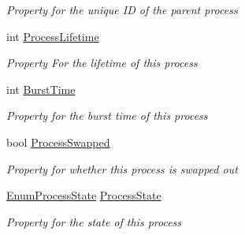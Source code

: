 \begin{DoxyCompactItemize}
\begin{DoxyCompactList}\small\item\em Property for the unique I\+D of the parent process \end{DoxyCompactList}\item 
int \hyperlink{class_c_p_u___o_s___simulator_1_1_operating___system_1_1_simulator_process_afa82367303a9ea2effba290493847605}{Process\+Lifetime}
\begin{DoxyCompactList}\small\item\em Property For the lifetime of this process \end{DoxyCompactList}\item 
int \hyperlink{class_c_p_u___o_s___simulator_1_1_operating___system_1_1_simulator_process_a5a340d3421e4251b758752de009b7758}{Burst\+Time}
\begin{DoxyCompactList}\small\item\em Property for the burst time of this process \end{DoxyCompactList}\item 
bool \hyperlink{class_c_p_u___o_s___simulator_1_1_operating___system_1_1_simulator_process_a7886e0890797887fcdd65b6eac62cfc0}{Process\+Swapped}
\begin{DoxyCompactList}\small\item\em Property for whether this process is swapped out \end{DoxyCompactList}\item 
\hyperlink{namespace_c_p_u___o_s___simulator_1_1_operating___system_a836ee2204e78fcb3a7dd6c3c942b1a24}{Enum\+Process\+State} \hyperlink{class_c_p_u___o_s___simulator_1_1_operating___system_1_1_simulator_process_a388763de47e217fd742858413c5b169f}{Process\+State}
\begin{DoxyCompactList}\small\item\em Property for the state of this process \end{DoxyCompactList}\end{DoxyCompactItemize}
